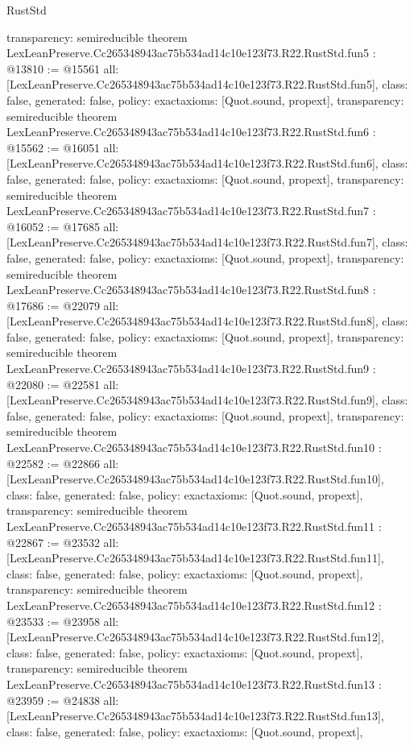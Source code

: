 \begin{lexlean}{RustStd}
\begin{coremodule}
{  transparency: semireducible
}
theorem LexLeanPreserve.Cc265348943ac75b534ad14c10e123f73.R22.RustStd.fun5 : @13810 := @15561 {
  all: [LexLeanPreserve.Cc265348943ac75b534ad14c10e123f73.R22.RustStd.fun5],
  class: false,
  generated: false,
  policy: exact{axioms: [Quot.sound, propext]},
  transparency: semireducible
}
theorem LexLeanPreserve.Cc265348943ac75b534ad14c10e123f73.R22.RustStd.fun6 : @15562 := @16051 {
  all: [LexLeanPreserve.Cc265348943ac75b534ad14c10e123f73.R22.RustStd.fun6],
  class: false,
  generated: false,
  policy: exact{axioms: [Quot.sound, propext]},
  transparency: semireducible
}
theorem LexLeanPreserve.Cc265348943ac75b534ad14c10e123f73.R22.RustStd.fun7 : @16052 := @17685 {
  all: [LexLeanPreserve.Cc265348943ac75b534ad14c10e123f73.R22.RustStd.fun7],
  class: false,
  generated: false,
  policy: exact{axioms: [Quot.sound, propext]},
  transparency: semireducible
}
theorem LexLeanPreserve.Cc265348943ac75b534ad14c10e123f73.R22.RustStd.fun8 : @17686 := @22079 {
  all: [LexLeanPreserve.Cc265348943ac75b534ad14c10e123f73.R22.RustStd.fun8],
  class: false,
  generated: false,
  policy: exact{axioms: [Quot.sound, propext]},
  transparency: semireducible
}
theorem LexLeanPreserve.Cc265348943ac75b534ad14c10e123f73.R22.RustStd.fun9 : @22080 := @22581 {
  all: [LexLeanPreserve.Cc265348943ac75b534ad14c10e123f73.R22.RustStd.fun9],
  class: false,
  generated: false,
  policy: exact{axioms: [Quot.sound, propext]},
  transparency: semireducible
}
theorem LexLeanPreserve.Cc265348943ac75b534ad14c10e123f73.R22.RustStd.fun10 : @22582 := @22866 {
  all: [LexLeanPreserve.Cc265348943ac75b534ad14c10e123f73.R22.RustStd.fun10],
  class: false,
  generated: false,
  policy: exact{axioms: [Quot.sound, propext]},
  transparency: semireducible
}
theorem LexLeanPreserve.Cc265348943ac75b534ad14c10e123f73.R22.RustStd.fun11 : @22867 := @23532 {
  all: [LexLeanPreserve.Cc265348943ac75b534ad14c10e123f73.R22.RustStd.fun11],
  class: false,
  generated: false,
  policy: exact{axioms: [Quot.sound, propext]},
  transparency: semireducible
}
theorem LexLeanPreserve.Cc265348943ac75b534ad14c10e123f73.R22.RustStd.fun12 : @23533 := @23958 {
  all: [LexLeanPreserve.Cc265348943ac75b534ad14c10e123f73.R22.RustStd.fun12],
  class: false,
  generated: false,
  policy: exact{axioms: [Quot.sound, propext]},
  transparency: semireducible
}
theorem LexLeanPreserve.Cc265348943ac75b534ad14c10e123f73.R22.RustStd.fun13 : @23959 := @24838 {
  all: [LexLeanPreserve.Cc265348943ac75b534ad14c10e123f73.R22.RustStd.fun13],
  class: false,
  generated: false,
  policy: exact{axioms: [Quot.sound, propext]},
}
\end{coremodule}
\end{lexlean}
